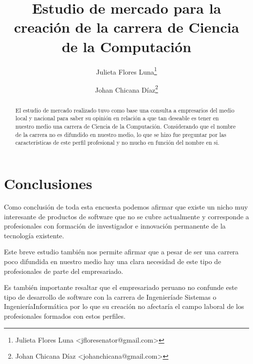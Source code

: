 \documentclass[a4paper,10pt]{article}
\title{Estudio de mercado para la creación de la carrera de Ciencia de la Computación}
\author{Julieta Flores Luna\footnote{Julieta Flores Luna <jfloresenator@gmail.com>}
\and Johan Chicana Díaz\footnote{Johan Chicana Díaz <johanchicana@gmail.com>}}
\begin{document}
\maketitle

\begin{abstract}
El estudio de mercado realizado tuvo como base una consulta a empresarios del medio local y nacional para saber su opinión en relación a que tan deseable es tener en nuestro medio una carrera de Ciencia de la Computación. Considerando que el nombre de la carrera no es difundido en nuestro medio, lo que se hizo fue preguntar por las características de este perfil profesional y no mucho en función del nombre en si.
\end{abstract}





\section{Conclusiones}
Como conclusión de toda esta encuesta podemos afirmar que existe un nicho muy interesante de productos de software que no se cubre actualmente y corresponde a profesionales con formación de investigador e innovación permanente de la tecnología existente.

Este breve estudio también nos permite afirmar que a pesar de ser una carrera poco difundida en nuestro medio hay una clara necesidad de este tipo de profesionales de parte del empresariado.

Es también importante resaltar que el empresariado peruano no confunde este tipo de desarrollo de software con la carrera de Ingenieríade Sistemas o IngenieríaInformática por lo que su creación no afectaría el campo laboral de los profesionales formados con estos perfiles.
\end{document}
